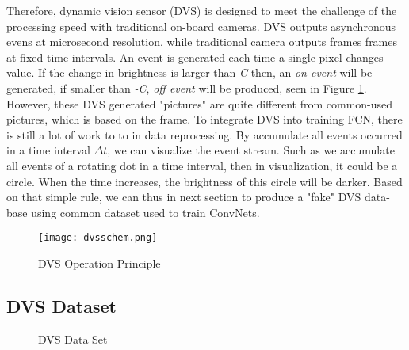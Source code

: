 Therefore, dynamic vision sensor (DVS) is designed to meet the challenge of the processing speed with traditional on-board cameras. DVS outputs asynchronous evens at microsecond resolution, while traditional camera outputs frames frames at fixed time intervals. An event is generated each time a single pixel changes value. If the change in brightness is larger than \emph{C} then, an \emph{on event} will be generated, if smaller than \emph{-C}, \emph{off event} will be produced, seen in Figure \ref{fig:dvsscheme}. However, these DVS generated "pictures" are quite different from common-used pictures, which is based on the frame. To integrate DVS into training FCN, there is still a lot of work to to in data reprocessing. By accumulate all events occurred in a time interval $\Delta t$, we can visualize the event stream. Such as we accumulate all events of a rotating dot in a time interval, then in visualization, it could be a circle. When the time increases, the brightness of this circle will be darker. Based on that simple rule, we can thus in next section to produce a "fake" DVS data-base using common dataset used to train ConvNets.
\begin{figure}
	\centering\textbf{}
	\texttt{[image: dvsschem.png]}
	\caption{DVS Operation Principle\cite{davide}}
	\label{fig:dvsscheme}
\end{figure}

\subsection{DVS Dataset}

\begin{figure}
\centering
{}
\caption{DVS Data Set}
\label{fig:dvsdata}
\end{figure}


